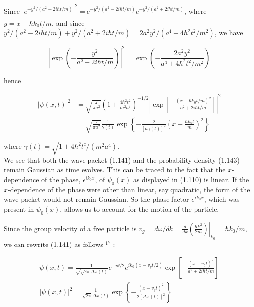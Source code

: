 \documentclass[10pt]{article}
\begin{document}
Since $\left|e^{-y^{2} /\left(a^{2}+2 i \hbar t / m\right)}\right|^{2}=e^{-y^{2} /\left(a^{2}-2 i \hbar t / m\right)} e^{-y^{2} /\left(a^{2}+2 i \hbar t / m\right)}$, where $y=x-\hbar k_{0} t / m$, and since $y^{2} /\left(a^{2}-2 i \hbar t / m\right)+y^{2} /\left(a^{2}+2 i \hbar t / m\right)=2 a^{2} y^{2} /\left(a^{4}+4 \hbar^{2} t^{2} / m^{2}\right)$, we have


\begin{equation*}
\left|\exp \left(-\frac{y^{2}}{a^{2}+2 i \hbar t / m}\right)\right|^{2}=\exp \left(-\frac{2 a^{2} y^{2}}{a^{4}+4 \hbar^{2} t^{2} / m^{2}}\right) \tag{1.142}
\end{equation*}


hence


\begin{align*}
|\psi(x, t)|^{2} & =\sqrt{\frac{2}{\pi a^{2}}}\left(1+\frac{4 \hbar^{2} t^{2}}{m^{2} a^{4}}\right)^{-1 / 2}\left|\exp \left[-\frac{\left(x-\hbar k_{0} t / m\right)^{2}}{a^{2}+2 i \hbar t / m}\right]\right|^{2} \\
& =\sqrt{\frac{2}{\pi a^{2}}} \frac{1}{\gamma(t)} \exp \left\{-\frac{2}{[a \gamma(t)]^{2}}\left(x-\frac{\hbar k_{0} t}{m}\right)^{2}\right\} \tag{1.143}
\end{align*}


where $\gamma(t)=\sqrt{1+4 \hbar^{2} t^{2} /\left(m^{2} a^{4}\right)}$.\\
We see that both the wave packet (1.141) and the probability density (1.143) remain Gaussian as time evolves. This can be traced to the fact that the $x$-dependence of the phase, $e^{i k_{0} x}$, of $\psi_{0}(x)$ as displayed in (1.110) is linear. If the $x$-dependence of the phase were other than linear, say quadratic, the form of the wave packet would not remain Gaussian. So the phase factor $e^{i k_{0} x}$, which was present in $\psi_{0}(x)$, allows us to account for the motion of the particle.

Since the group velocity of a free particle is $v_{g}=d \omega / d k=\left.\frac{d}{d k}\left(\frac{\hbar k^{2}}{2 m}\right)\right|_{k_{0}}=\hbar k_{0} / m$, we can rewrite (1.141) as follows ${ }^{17}$ :


\begin{gather*}
\psi(x, t)=\frac{1}{\sqrt{\sqrt{2 \pi} \Delta x(t)}} e^{-i \theta / 2} e^{i k_{0}\left(x-v_{g} t / 2\right)} \exp \left[-\frac{\left(x-v_{g} t\right)^{2}}{a^{2}+2 i \hbar t / m}\right]  \tag{1.144}\\
|\psi(x, t)|^{2}=\frac{1}{\sqrt{2 \pi} \Delta x(t)} \exp \left\{-\frac{\left(x-v_{g} t\right)^{2}}{2[\Delta x(t)]^{2}}\right\} \tag{1.145}
\end{gather*}
\end{document}
